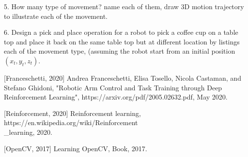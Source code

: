 \documentclass[conference]{IEEEtran}
\begin{document}
5. How many type of movement? name each of them, draw 3D motion trajectory 
to illustrate each of the movement. 

6. Design a pick and place operation for a robot to pick a coffee cup on
a table top and place it back on the same table top but at different 
location by listings each of the movement type, (assuming the robot start
from an initial position $(x_t,y_t,z_t)$. 
 
\begin{thebibliography}{1} 
[Franceschetti, 2020] 
Andrea Franceschetti, Elisa Tosello, Nicola Castaman, and Stefano
Ghidoni, 
"Robotic Arm Control and Task Training
through Deep Reinforcement Learning", 
https://arxiv.org/pdf/2005.02632.pdf, May 2020. 

[Reinforcement, 2020] 
Reinforcement learning, 
https://en.wikipedia.org/wiki/Reinforcement \\ \_learning, 2020. 

[OpenCV, 2017] 
Learning OpenCV, Book, 2017. 

\end{thebibliography}
 

\end{document}
